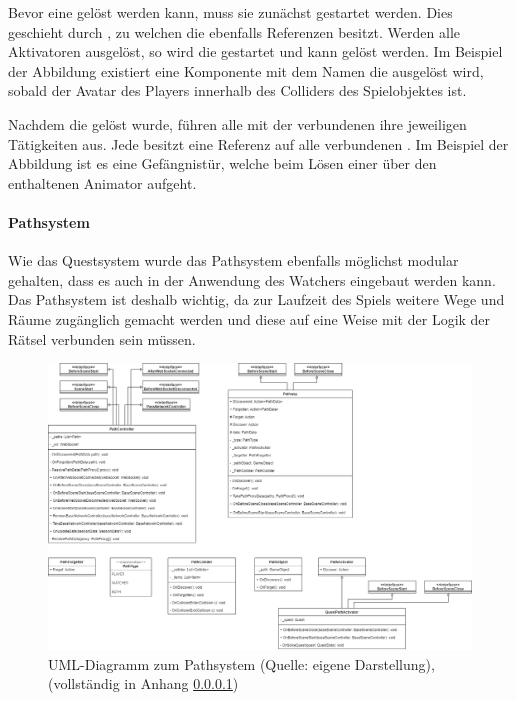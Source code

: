 Bevor eine  gelöst werden kann, muss sie zunächst gestartet werden. Dies geschieht durch , zu welchen die  ebenfalls Referenzen besitzt. Werden alle Aktivatoren ausgelöst, so wird die  gestartet und kann gelöst werden. Im Beispiel der Abbildung existiert eine Komponente mit dem Namen  die ausgelöst wird, sobald der Avatar des Players innerhalb des Colliders des Spielobjektes ist.

Nachdem die  gelöst wurde, führen alle mit der  verbundenen  ihre jeweiligen Tätigkeiten aus. Jede  besitzt eine Referenz auf alle verbundenen . Im Beispiel der Abbildung ist es eine Gefängnistür, welche beim Lösen einer  über den enthaltenen Animator aufgeht.

\paragraph{Pathsystem}
Wie das Questsystem wurde das Pathsystem ebenfalls möglichst modular gehalten, dass es auch in der Anwendung des Watchers eingebaut werden kann. Das Pathsystem ist deshalb wichtig, da zur Laufzeit des Spiels weitere Wege und Räume zugänglich gemacht werden und diese auf eine Weise mit der Logik der Rätsel verbunden sein müssen.

\begin{figure}[ht]
\centering
\includegraphics[width=1\linewidth]{content/pictures/PathSystem.drawio.png}
\caption{UML-Diagramm zum Pathsystem (Quelle: eigene Darstellung), (vollständig in Anhang \ref{})}
\label{fig:path-system-uml}
\end{figure}


